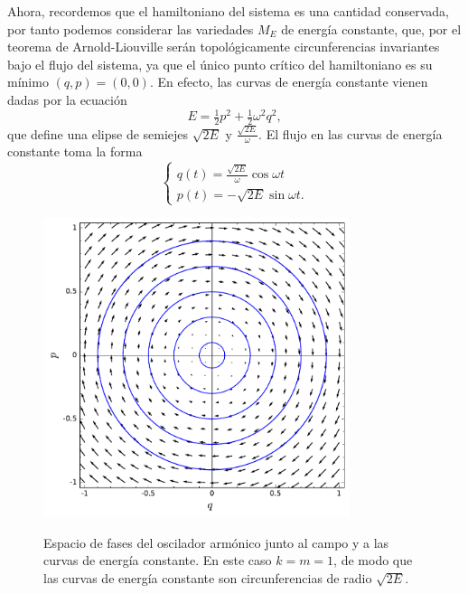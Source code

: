   Ahora, recordemos que el hamiltoniano del sistema es una cantidad conservada, por tanto podemos considerar las variedades $M_E$ de energía constante, que, por el teorema de Arnold-Liouville serán topológicamente circunferencias invariantes bajo el flujo del sistema, ya que el único punto crítico del hamiltoniano es su mínimo $(q,p)=(0,0)$. En efecto, las curvas de energía constante vienen dadas por la ecuación
  \begin{equation*}
    E=\tfrac{1}{2}p^2+\tfrac{1}{2}\omega^2q^2,
  \end{equation*}
  que define una elipse de semiejes $\sqrt{2E}$ y $\frac{\sqrt{2E}}{\omega}$. El flujo en las curvas de energía constante toma la forma
  \begin{equation*}
    \begin{cases}
      q(t)=\frac{\sqrt{2E}}{\omega}\cos\omega t \\ 
      p(t)=-\sqrt{2E}\sin\omega t.
 \end{cases}
  \end{equation*}
  
  \begin{figure}[h]
    \centering
    \includegraphics[width=0.8\textwidth]{pics/oscilador}
    \label{fig:oscilador}
    \caption{\small Espacio de fases del oscilador armónico junto al campo y a las curvas de energía constante. En este caso $k=m=1$, de modo que las curvas de energía constante son circunferencias de radio $\sqrt{2E}$.}
  \end{figure}

